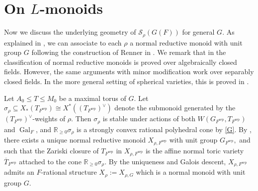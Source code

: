 \documentclass[10pt]{amsart}
\theoremstyle{definition}
\numberwithin{equation}{section}
\DeclareMathOperator{\Gal}{\mathrm{Gal}}
\numberwithin{equation}{subsection}
\newcommand{\RR}{\mathbb{R}}
\begin{document}

\section{On $L$-monoids}\label{sec:Lmonoids}


Now we discuss the underlying geometry of $\mathcal{S}_\rho(G(F))$ for general $G$. As explained in \cite[\S5.1]{Ngo:Hankel}, we can associate to each $\rho$ a normal reductive monoid with unit group $G$ following the construction of Renner in \cite[\S 5.1]{Renner:AlgebraMonoids}. We remark that in  \cite[\S 5.1]{Renner:AlgebraMonoids} the classification of normal reductive monoids is proved over algebraically closed fields. However, the same arguments with minor modification work over separably closed fields. In the more general setting of spherical varieties, this is proved in \cite{Wedhorn:Spherical}. 

Let $A_0\le T\le M_0$ be a maximal torus of $G$. Let $\sigma_{\rho}\subseteq X_*(T_{F^\mathrm{sep}}) \cong X^*((T_{F^\mathrm{sep}})^\vee)$ denote the submonoid generated by the $(T_{F^{\mathrm{sep}}})^\vee$-weights of $\rho$. Then $\sigma_{\rho}$ is stable under actions of both $W(G_{F^{\mathrm{sep}}},T_{F^{\mathrm{sep}}})$ and $\Gal_F$, and $\mathbb{R}_{\geq 0}\sigma_{\rho}$ is a strongly convex rational polyhedral cone by \eqref{G}. By \cite[Theorem 5.4]{Renner:AlgebraMonoids}, there exists a unique normal reductive monoid $X_{\rho,F^{\mathrm{sep}}}$ with unit group $G_{F^{\mathrm{sep}}},$ and such that the Zariski closure of $T_{F^{\mathrm{sep}}}$ in  $X_{\rho,F^{\mathrm{sep}}}$ is the affine normal toric variety $\overline{T}_{F^{\mathrm{sep}}}$ attached to the cone $\RR_{\ge 0}\sigma_{\rho}$. By the uniqueness and Galois descent, $X_{\rho,F^{\mathrm{sep}}}$ admits an $F$-rational structure $X_\rho:=X_{\rho,G}$ which is a normal monoid with unit group $G$. 

\end{document}
